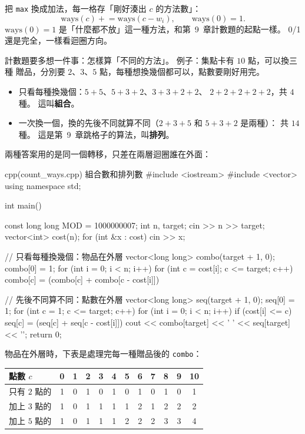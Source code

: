 把 \texttt{max} 換成加法，每一格存「剛好湊出 $c$ 的方法數」：
\[
\mathrm{ways}(c) \mathrel{+}= \mathrm{ways}(c - w_i),\qquad \mathrm{ways}(0) = 1.
\]
$\mathrm{ways}(0) = 1$ 是「什麼都不放」這一種方法，和第~9~章計數題的起點一樣。
0/1 還是完全，一樣看迴圈方向。

計數題要多想一件事：怎樣算「不同的方法」。 例子：集點卡有 $10$ 點，可以換三種
贈品，分別要 $2$、$3$、$5$ 點，每種想換幾個都可以，點數要剛好用完。

\begin{itemize}
\item 只看每種換幾個：$5 + 5$、$5 + 3 + 2$、$3 + 3 + 2 + 2$、
$2 + 2 + 2 + 2 + 2$，共 $4$ 種。 這叫\textbf{組合}。
\item 一次換一個，換的先後不同就算不同（$2 + 3 + 5$ 和 $5 + 3 + 2$ 是兩種）：
共 $14$ 種。 這是第~9~章跳格子的算法，叫\textbf{排列}。
\end{itemize}

兩種答案用的是同一個轉移，只差在兩層迴圈誰在外面：

\begin{example}[label=ex:count-ways]{cpp}{(count\_ways.cpp) 組合數和排列數}
#include <iostream>
#include <vector>
using namespace std;

int main() {
    const long long MOD = 1000000007;
    int n, target;
    cin >> n >> target;
    vector<int> cost(n);
    for (int &x : cost) {
        cin >> x;
    }

    // 只看每種換幾個：物品在外層
    vector<long long> combo(target + 1, 0);
    combo[0] = 1;
    for (int i = 0; i < n; i++) {
        for (int c = cost[i]; c <= target; c++) {
            combo[c] = (combo[c] + combo[c - cost[i]]) %
        }
    }

    // 先後不同算不同：點數在外層
    vector<long long> seq(target + 1, 0);
    seq[0] = 1;
    for (int c = 1; c <= target; c++) {
        for (int i = 0; i < n; i++) {
            if (cost[i] <= c) {
                seq[c] = (seq[c] + seq[c - cost[i]]) %
            }
        }
    }
    cout << combo[target] << ' ' << seq[target] << '\n';
    return 0;
}
\end{example}


物品在外層時，下表是處理完每一種贈品後的 \texttt{combo}：

\begin{center}
\begin{tabular}{l|ccccccccccc}
\toprule
點數 $c$ & 0 & 1 & 2 & 3 & 4 & 5 & 6 & 7 & 8 & 9 & 10 \\
\midrule
只有 $2$ 點的 & 1 & 0 & 1 & 0 & 1 & 0 & 1 & 0 & 1 & 0 & 1 \\
加上 $3$ 點的 & 1 & 0 & 1 & 1 & 1 & 1 & 2 & 1 & 2 & 2 & 2 \\
加上 $5$ 點的 & 1 & 0 & 1 & 1 & 1 & 2 & 2 & 2 & 3 & 3 & 4 \\
\bottomrule
\end{tabular}
\end{center}

